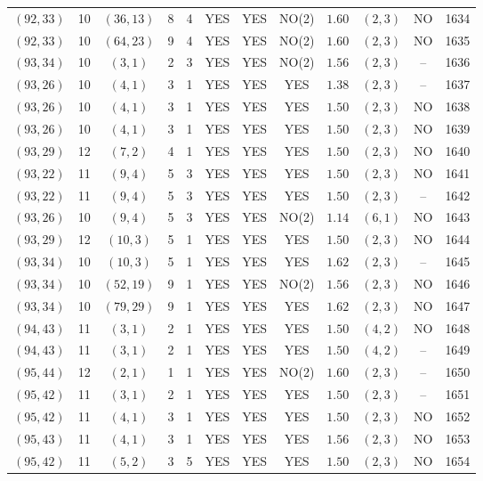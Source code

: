 \begin{longtable}{|c|c|c|c|c|c|c|c|c|c|c|c|}
$(92,33)$ & 10 & $(36,13)$ & 8 & 4 & YES & YES & NO(2) & $1.60$ & $(2,3)$ & NO & 1634\\
$(92,33)$ & 10 & $(64,23)$ & 9 & 4 & YES & YES & NO(2) & $1.60$ & $(2,3)$ & NO & 1635\\
$(93,34)$ & 10 & $(3,1)$ & 2 & 3 & YES & YES & NO(2) & $1.56$ & $(2,3)$ & -- & 1636\\
$(93,26)$ & 10 & $(4,1)$ & 3 & 1 & YES & YES & YES & $1.38$ & $(2,3)$ & -- & 1637\\
$(93,26)$ & 10 & $(4,1)$ & 3 & 1 & YES & YES & YES & $1.50$ & $(2,3)$ & NO & 1638\\
$(93,26)$ & 10 & $(4,1)$ & 3 & 1 & YES & YES & YES & $1.50$ & $(2,3)$ & NO & 1639\\
$(93,29)$ & 12 & $(7,2)$ & 4 & 1 & YES & YES & YES & $1.50$ & $(2,3)$ & NO & 1640\\
$(93,22)$ & 11 & $(9,4)$ & 5 & 3 & YES & YES & YES & $1.50$ & $(2,3)$ & NO & 1641\\
$(93,22)$ & 11 & $(9,4)$ & 5 & 3 & YES & YES & YES & $1.50$ & $(2,3)$ & -- & 1642\\
$(93,26)$ & 10 & $(9,4)$ & 5 & 3 & YES & YES & NO(2) & $1.14$ & $(6,1)$ & NO & 1643\\
$(93,29)$ & 12 & $(10,3)$ & 5 & 1 & YES & YES & YES & $1.50$ & $(2,3)$ & NO & 1644\\
$(93,34)$ & 10 & $(10,3)$ & 5 & 1 & YES & YES & YES & $1.62$ & $(2,3)$ & -- & 1645\\
$(93,34)$ & 10 & $(52,19)$ & 9 & 1 & YES & YES & NO(2) & $1.56$ & $(2,3)$ & NO & 1646\\
$(93,34)$ & 10 & $(79,29)$ & 9 & 1 & YES & YES & YES & $1.62$ & $(2,3)$ & NO & 1647\\
$(94,43)$ & 11 & $(3,1)$ & 2 & 1 & YES & YES & YES & $1.50$ & $(4,2)$ & NO & 1648\\
$(94,43)$ & 11 & $(3,1)$ & 2 & 1 & YES & YES & YES & $1.50$ & $(4,2)$ & -- & 1649\\
$(95,44)$ & 12 & $(2,1)$ & 1 & 1 & YES & YES & NO(2) & $1.60$ & $(2,3)$ & -- & 1650\\
$(95,42)$ & 11 & $(3,1)$ & 2 & 1 & YES & YES & YES & $1.50$ & $(2,3)$ & -- & 1651\\
$(95,42)$ & 11 & $(4,1)$ & 3 & 1 & YES & YES & YES & $1.50$ & $(2,3)$ & NO & 1652\\
$(95,43)$ & 11 & $(4,1)$ & 3 & 1 & YES & YES & YES & $1.56$ & $(2,3)$ & NO & 1653\\
$(95,42)$ & 11 & $(5,2)$ & 3 & 5 & YES & YES & YES & $1.50$ & $(2,3)$ & NO & 1654\\

\end{longtable}
